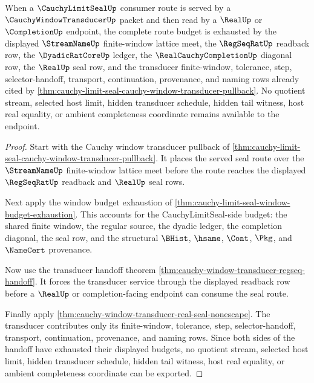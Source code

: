 \begin{theorem}
\label{thm:cauchy-limit-seal-transducer-route-budget-exhaustion}
When a $\CauchyLimitSealUp$ consumer route is served by a $\CauchyWindowTransducerUp$ packet and then read by a $\RealUp$ or $\CompletionUp$ endpoint, the complete route budget is exhausted by the displayed $\StreamNameUp$ finite-window lattice meet, the $\RegSeqRatUp$ readback row, the $\DyadicRatCoreUp$ ledger, the $\RealCauchyCompletionUp$ diagonal row, the $\RealUp$ seal row, and the transducer finite-window, tolerance, step, selector-handoff, transport, continuation, provenance, and naming rows already cited by \autoref{thm:cauchy-limit-seal-cauchy-window-transducer-pullback}. No quotient stream, selected host limit, hidden transducer schedule, hidden tail witness, host real equality, or ambient completeness coordinate remains available to the endpoint.
\end{theorem}
\begin{proof}
Start with the Cauchy window transducer pullback of \autoref{thm:cauchy-limit-seal-cauchy-window-transducer-pullback}. It places the served seal route over the $\StreamNameUp$ finite-window lattice meet before the route reaches the displayed $\RegSeqRatUp$ readback and $\RealUp$ seal rows.

Next apply the window budget exhaustion of \autoref{thm:cauchy-limit-seal-window-budget-exhaustion}. This accounts for the CauchyLimitSeal-side budget: the shared finite window, the regular source, the dyadic ledger, the completion diagonal, the seal row, and the structural $\BHist$, $\hsame$, $\Cont$, $\Pkg$, and $\NameCert$ provenance.

Now use the transducer handoff theorem \autoref{thm:cauchy-window-transducer-regseq-handoff}. It forces the transducer service through the displayed readback row before a $\RealUp$ or completion-facing endpoint can consume the seal route.

Finally apply \autoref{thm:cauchy-window-transducer-real-seal-nonescape}. The transducer contributes only its finite-window, tolerance, step, selector-handoff, transport, continuation, provenance, and naming rows. Since both sides of the handoff have exhausted their displayed budgets, no quotient stream, selected host limit, hidden transducer schedule, hidden tail witness, host real equality, or ambient completeness coordinate can be exported.
\end{proof}

